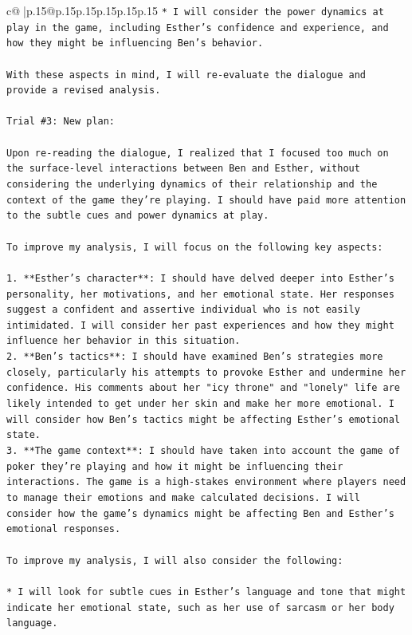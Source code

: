 \documentclass{article}
\begin{document}
{\begin{supertabular}{c@{$\;$}|p{.15\linewidth}@{}p{.15\linewidth}p{.15\linewidth}p{.15\linewidth}p{.15\linewidth}p{.15\linewidth}}
{{{\texttt{* I will consider the power dynamics at play in the game, including Esther's confidence and experience, and how they might be influencing Ben's behavior.} \\
\\ 
\texttt{With these aspects in mind, I will re{-}evaluate the dialogue and provide a revised analysis.} \\
\\ 
\texttt{Trial \#3: New plan: } \\
\\ 
\texttt{Upon re{-}reading the dialogue, I realized that I focused too much on the surface{-}level interactions between Ben and Esther, without considering the underlying dynamics of their relationship and the context of the game they're playing. I should have paid more attention to the subtle cues and power dynamics at play.} \\
\\ 
\texttt{To improve my analysis, I will focus on the following key aspects:} \\
\\ 
\texttt{1. **Esther's character**: I should have delved deeper into Esther's personality, her motivations, and her emotional state. Her responses suggest a confident and assertive individual who is not easily intimidated. I will consider her past experiences and how they might influence her behavior in this situation.} \\
\texttt{2. **Ben's tactics**: I should have examined Ben's strategies more closely, particularly his attempts to provoke Esther and undermine her confidence. His comments about her "icy throne" and "lonely" life are likely intended to get under her skin and make her more emotional. I will consider how Ben's tactics might be affecting Esther's emotional state.} \\
\texttt{3. **The game context**: I should have taken into account the game of poker they're playing and how it might be influencing their interactions. The game is a high{-}stakes environment where players need to manage their emotions and make calculated decisions. I will consider how the game's dynamics might be affecting Ben and Esther's emotional responses.} \\
\\ 
\texttt{To improve my analysis, I will also consider the following:} \\
\\ 
\texttt{* I will look for subtle cues in Esther's language and tone that might indicate her emotional state, such as her use of sarcasm or her body language.} \\
}}}
\end{supertabular}}
\end{document}
